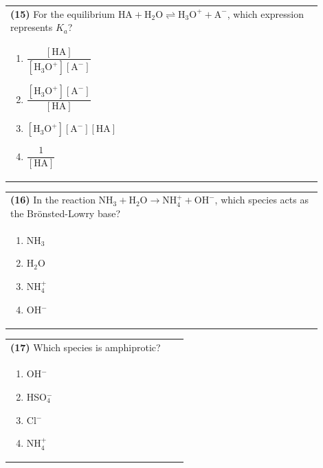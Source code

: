 \documentclass{article}
\begin{document}
\noindent\begin{tabular}{|p{0.9\linewidth}|}
\hline
\textbf{(15)} For the equilibrium $\text{HA} + \text{H}_2\text{O} \rightleftharpoons \text{H}_3\text{O}^+ + \text{A}^-$, which expression represents $K_a$? \\[0.2cm]
\begin{minipage}[t]{0.85\linewidth}
\begin{enumerate}[label=\alph*.]
\item $\dfrac{[\text{HA}]}{[\text{H}_3\text{O}^+][\text{A}^-]}$ \item $\dfrac{[\text{H}_3\text{O}^+][\text{A}^-]}{[\text{HA}]}$ \item $[\text{H}_3\text{O}^+][\text{A}^-][\text{HA}]$ \item $\dfrac{1}{[\text{HA}]}$
\end{enumerate}
\end{minipage}\\[0.2cm]
\hline
\end{tabular}

\noindent\begin{tabular}{|p{0.9\linewidth}|}
\hline
\textbf{(16)} In the reaction $\text{NH}_3 + \text{H}_2\text{O} \rightarrow \text{NH}_4^+ + \text{OH}^-$, which species acts as the Brönsted-Lowry base?\\[0.2cm]
\begin{minipage}[t]{0.85\linewidth}
\begin{enumerate}[label=\alph*.]
\item NH$_3$
\item H$_2$O
\item NH$_4^+$
\item OH$^-$
\end{enumerate}
\end{minipage}\\[0.2cm]
\hline
\end{tabular}
\newpage

\noindent\begin{tabular}{|p{0.9\linewidth}|}
\hline
\textbf{(17)} Which species is amphiprotic? \\[0.2cm]
\begin{minipage}{0.85\linewidth}
\begin{enumerate}[label=\alph*.]
\item OH$^-$ \item HSO$_4^-$ \item Cl$^-$ \item NH$_4^+$
\end{enumerate}
\end{minipage}\\[0.2cm]
\hline
\end{tabular}
\end{document}
